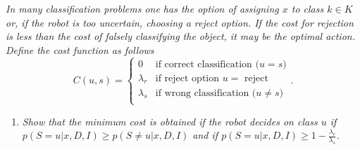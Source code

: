 	
	\begin{example}
		\emph{In many classification problems one has the option of assigning $x$ to class $k\in K$ or, if the robot is too uncertain, choosing a reject option. If the cost for rejection is less than the cost of falsely classifying the object, it may be the optimal action. Define the cost function as follows}
		\begin{equation}
			C(u,s)=\begin{cases}
				0 & \text{if correct classification ($u=s$)}\\
				\lambda_r & \text{if reject option $u=$ reject}\\
				\lambda_s & \text{if wrong classification ($u\neq s$)}\\
			\end{cases}.
		\end{equation}
		
		\begin{enumerate}
			\item \emph{Show that the minimum cost is obtained if the robot decides on class $u$ if $p(S=u|x,D,I)\geq p(S\neq u|x,D,I)$ and if $p(S=u|x,D,I)\geq 1-\frac{\lambda_r}{\lambda_s}$.}\newline
			

\end{enumerate}
\end{example}
